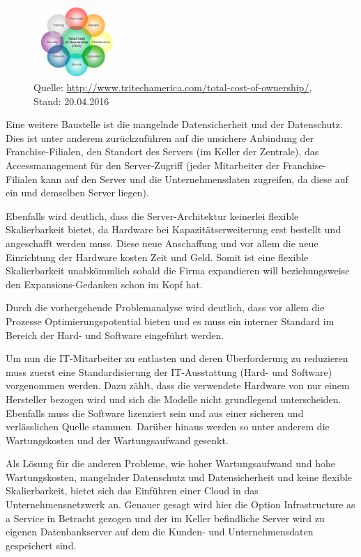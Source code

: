 \begin{figure}[H]
\centering\includegraphics[width=0.3\textwidth]{img/tco}
\caption[Bestandteile der Total Cost of Ownership]{Quelle:
  \url{http://www.tritechamerica.com/total-cost-of-ownership/}, Stand:
  20.04.2016}
\end{figure}

Eine weitere Baustelle ist die mangelnde Datensicherheit und der
Datenschutz. Dies ist unter anderem zurückzuführen auf die unsichere
Anbindung der Franchise-Filialen, den Standort des Servers (im Keller
der Zentrale), das Accessmanagement für den Server-Zugriff (jeder
Mitarbeiter der Franchise-Filialen kann auf den Server und die
Unternehmensdaten zugreifen, da diese auf ein und demselben Server
liegen).

Ebenfalls wird deutlich, dass die Server-Architektur keinerlei
flexible Skalierbarkeit bietet, da Hardware bei Kapazitätserweiterung
erst bestellt und angeschafft werden muss. Diese neue Anschaffung und
vor allem die neue Einrichtung der Hardware kosten Zeit und
Geld. Somit ist eine flexible Skalierbarkeit unabkömmlich sobald die
Firma expandieren will beziehungsweise den Expansions-Gedanken schon
im Kopf hat.

Durch die vorhergehende Problemanalyse wird deutlich, dass vor allem
die Prozesse Optimierungspotential bieten und es muss ein interner
Standard im Bereich der Hard- und Software eingeführt werden.

Um nun die IT-Mitarbeiter zu entlasten und deren Überforderung zu
reduzieren muss zuerst eine Standardisierung der IT-Ausstattung (Hard-
und Software) vorgenommen werden. Dazu zählt, dass die verwendete
Hardware von nur einem Hersteller bezogen wird und sich die Modelle
nicht grundlegend unterscheiden. Ebenfalls muss die Software
lizenziert sein und aus einer sicheren und verlässlichen Quelle
stammen. Darüber hinaus werden so unter anderem die Wartungskosten und
der Wartungsaufwand gesenkt.

Als Lösung für die anderen Probleme, wie hoher Wartungsaufwand und
hohe Wartungskosten, mangelnder Datenschutz und Datensicherheit und
keine flexible Skalierbarkeit, bietet sich das Einführen einer Cloud
in das Unternehmensnetzwerk an. Genauer gesagt wird hier die Option
Infrastructure as a Service in Betracht gezogen und der im Keller
befindliche Server wird zu eigenen Datenbankserver auf dem die Kunden-
und Unternehmensdaten gespeichert sind.


